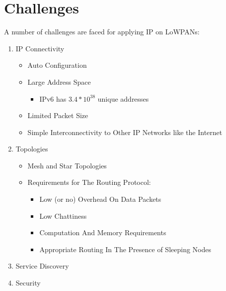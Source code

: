 \documentclass[10pt]{beamer}
\begin{document}
\section{Challenges}
\begin{frame}
    A number of challenges are faced for applying IP on LoWPANs\cite{rfc4919}:
    \begin{enumerate}
        \item IP Connectivity
            \begin{itemize}
                \item Auto Configuration
                \item Large Address Space
                    \begin{itemize}
                        \item IPv6 has $3.4*10^{38} $ unique addresses
                    \end{itemize}
                \item Limited Packet Size
                \item Simple Interconnectivity to Other IP Networks like the Internet
            \end{itemize}
        \item Topologies
            \begin{itemize}
                \item Mesh and Star Topologies
                \item Requirements for The Routing Protocol:
                    \begin{itemize}
                        \item Low (or no) Overhead On Data Packets
                        \item Low Chattiness
                        \item Computation And Memory Requirements
                        \item Appropriate Routing In The Presence of Sleeping Nodes
                    \end{itemize}
            \end{itemize}
        \item Service Discovery
        \item Security
    \end{enumerate}
\end{frame}
\end{document}
